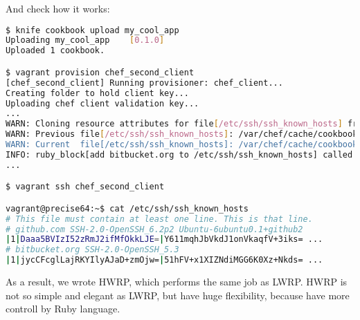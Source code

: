 And check how it works:

\begin{lstlisting}[language=Bash,label=lst:cookbook-hwrp12]
$ knife cookbook upload my_cool_app
Uploading my_cool_app    [0.1.0]
Uploaded 1 cookbook.

$ vagrant provision chef_second_client
[chef_second_client] Running provisioner: chef_client...
Creating folder to hold client key...
Uploading chef client validation key...
...
WARN: Cloning resource attributes for file[/etc/ssh/ssh_known_hosts] from prior resource (CHEF-3694)
WARN: Previous file[/etc/ssh/ssh_known_hosts]: /var/chef/cache/cookbooks/my_cool_app/providers/know_host.rb:39:in `insure_for_file'
WARN: Current  file[/etc/ssh/ssh_known_hosts]: /var/chef/cache/cookbooks/my_cool_app/libraries/provider_known_host.rb:62:in `insure_for_file'
INFO: ruby_block[add bitbucket.org to /etc/ssh/ssh_known_hosts] called
...

$ vagrant ssh chef_second_client

vagrant@precise64:~$ cat /etc/ssh/ssh_known_hosts
# This file must contain at least one line. This is that line.
# github.com SSH-2.0-OpenSSH_6.2p2 Ubuntu-6ubuntu0.1+github2
|1|Daaa5BVIzI52zRmJ2ifMfOkkLJE=|Y611mqhJbVkdJ1onVkaqfV+3iks= ...
# bitbucket.org SSH-2.0-OpenSSH_5.3
|1|jycCFcglLajRKYIlyAJaD+zmOjw=|51hFV+x1XIZNdiMGG6K0Xz+Nkds= ...
\end{lstlisting}

As a result, we wrote HWRP, which performs the same job as LWRP. HWRP is not so simple and elegant as LWRP, but have huge flexibility, because have more controll by Ruby language.